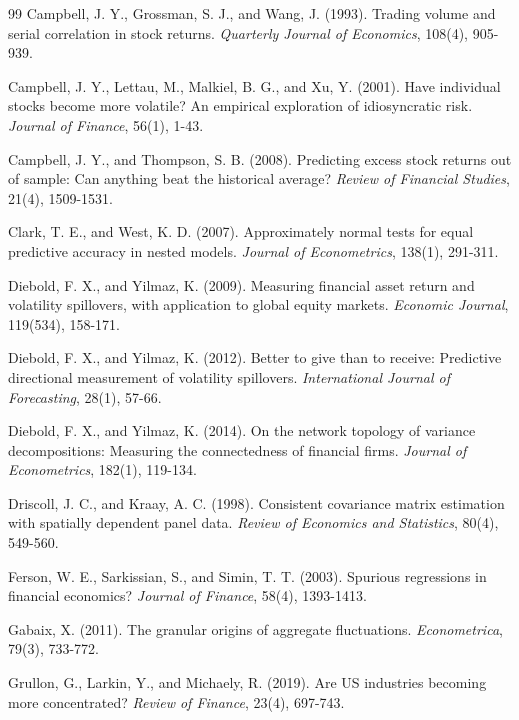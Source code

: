 \documentclass[11pt]{article}
\begin{document}
\begin{thebibliography}{99}
Campbell, J. Y., Grossman, S. J., and Wang, J. (1993). Trading volume and serial correlation in stock returns. \textit{Quarterly Journal of Economics}, 108(4), 905-939.

Campbell, J. Y., Lettau, M., Malkiel, B. G., and Xu, Y. (2001). Have individual stocks become more volatile? An empirical exploration of idiosyncratic risk. \textit{Journal of Finance}, 56(1), 1-43.

Campbell, J. Y., and Thompson, S. B. (2008). Predicting excess stock returns out of sample: Can anything beat the historical average? \textit{Review of Financial Studies}, 21(4), 1509-1531.

Clark, T. E., and West, K. D. (2007). Approximately normal tests for equal predictive accuracy in nested models. \textit{Journal of Econometrics}, 138(1), 291-311.

Diebold, F. X., and Yilmaz, K. (2009). Measuring financial asset return and volatility spillovers, with application to global equity markets. \textit{Economic Journal}, 119(534), 158-171.

Diebold, F. X., and Yilmaz, K. (2012). Better to give than to receive: Predictive directional measurement of volatility spillovers. \textit{International Journal of Forecasting}, 28(1), 57-66.

Diebold, F. X., and Yilmaz, K. (2014). On the network topology of variance decompositions: Measuring the connectedness of financial firms. \textit{Journal of Econometrics}, 182(1), 119-134.

Driscoll, J. C., and Kraay, A. C. (1998). Consistent covariance matrix estimation with spatially dependent panel data. \textit{Review of Economics and Statistics}, 80(4), 549-560.

Ferson, W. E., Sarkissian, S., and Simin, T. T. (2003). Spurious regressions in financial economics? \textit{Journal of Finance}, 58(4), 1393-1413.

Gabaix, X. (2011). The granular origins of aggregate fluctuations. \textit{Econometrica}, 79(3), 733-772.

Grullon, G., Larkin, Y., and Michaely, R. (2019). Are US industries becoming more concentrated? \textit{Review of Finance}, 23(4), 697-743.


\end{thebibliography}
\end{document}
